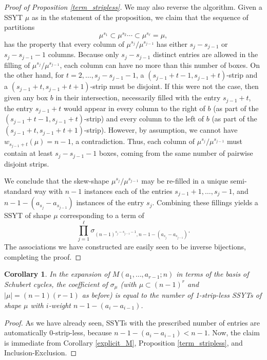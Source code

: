 \documentclass[11pt]{article}
\newtheorem{coro}[theo]{Corollary}
\theoremstyle{definition}
\numberwithin{equation}{section}
\begin{document}
\begin{proof}[Proof of Proposition \ref{term_stripless}]
We may also reverse the algorithm. Given a SSYT $\mu$ as in the statement of the proposition, we claim that the sequence of partitions
 \begin{equation*}
\mu^{s_1}\subset\mu^{s_2}\cdots\subset\mu^{s_\ell}=\mu,
 \end{equation*}
has the property that every column of $\mu^{s_j}/\mu^{s_{j-1}}$ has either $s_j-s_{j-1}$ or $s_{j}-s_{j-1}-1$ columns. Because only $s_j-s_{j-1}$ distinct entries are allowed in the filling of $\mu^{s_j}/\mu^{s_{j-1}}$, each column can have no more than this number of boxes. On the other hand, for $t=2,\ldots,s_j-s_{j-1}-1$, a $(s_{j-1}+t-1,s_{j-1}+t)$-strip and a $(s_{j-1}+t,s_{j-1}+t+1)$-strip must be disjoint. If this were not the case, then given any box $b$ in their intersection, necessarily filled with the entry $s_{j-1}+t$, the entry $s_{j-1}+t$ would appear in every column to the right of $b$ (as part of the $(s_{j-1}+t-1,s_{j-1}+t)$-strip) and every column to the left of $b$ (as part of the $(s_{j-1}+t,s_{j-1}+t+1)$-strip). However, by assumption, we cannot have $w_{s_{j-1}+t}(\mu)=n-1$, a contradiction. Thus, each column of $\mu^{s_j}/\mu^{s_{j-1}}$ must contain at least $s_j-s_{j-1}-1$ boxes, coming from the same number of pairwise disjoint strips.

We conclude that the skew-shape $\mu^{s_j}/\mu^{s_{j-1}}$ may be re-filled in a unique semi-standard way with $n-1$ instances each of the entries $s_{j-1}+1,\ldots,s_j-1$, and $n-1-(a_{s_j}-a_{s_{j-1}})$ instances of the entry $s_j$. Combining these fillings yields a SSYT of shape $\mu$ corresponding to a term of 
\begin{equation*}
 \prod_{j=1}^{\ell}\sigma_{(n-1)^{s_j-s_{j-1}-1},n-1-(a_{s_j}-a_{s_{j-1}})}.
 \end{equation*}
 The associations we have constructed are easily seen to be inverse bijections, completing the proof.
\end{proof}

\begin{coro}\label{pie_refined}
In the expansion of $M(a_1,\ldots,a_{r-1};n)$ in terms of the basis of Schubert cycles, the coefficient of $\sigma_\mu$ (with $\mu\subset(n-1)^{r}$ and $|\mu|=(n-1)(r-1)$ as before) is equal to the number of 1-strip-less SSYTs of shape $\mu$ with $i$-weight $n-1-(a_{i}-a_{i-1})$.
\end{coro}

\begin{proof}
As we have already seen, SSYTs with the prescribed number of entries are automatically 0-strip-less, because $n-1-(a_{i}-a_{i-1})<n-1$. Now, the claim is immediate from Corollary \ref{explicit_M}, Proposition \ref{term_stripless}, and Inclusion-Exclusion.
\end{proof}
\end{document}

